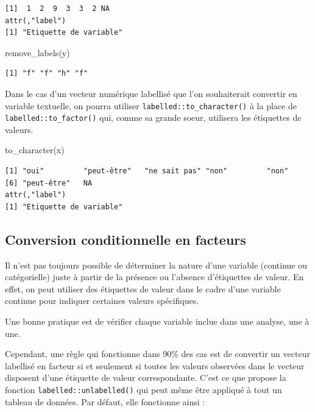 \documentclass[
  letterpaper,
  DIV=11,
  numbers=noendperiod,
  oneside]{scrreprt}
\newenvironment{Shaded}{\begin{snugshade}}{\end{snugshade}}
\newcommand{\FunctionTok}[1]{\textcolor[rgb]{0.28,0.35,0.67}{#1}}
\newcommand{\NormalTok}[1]{\textcolor[rgb]{0.00,0.23,0.31}{#1}}
\begin{document}
\begin{verbatim}
[1]  1  2  9  3  3  2 NA
attr(,"label")
[1] "Etiquette de variable"
\end{verbatim}

\begin{Shaded}
\begin{Highlighting}[]
\FunctionTok{remove\_labels}\NormalTok{(y)}
\end{Highlighting}
\end{Shaded}

\begin{verbatim}
[1] "f" "f" "h" "f"
\end{verbatim}

Dans le cas d'un vecteur numérique labellisé que l'on souhaiterait
convertir en variable textuelle, on pourra utiliser
\texttt{labelled::to\_character()} à la place de
\texttt{labelled::to\_factor()} qui, comme sa grande soeur, utilisera
les étiquettes de valeurs.

\begin{Shaded}
\begin{Highlighting}[]
\FunctionTok{to\_character}\NormalTok{(x)}
\end{Highlighting}
\end{Shaded}

\begin{verbatim}
[1] "oui"         "peut-être"   "ne sait pas" "non"         "non"        
[6] "peut-être"   NA           
attr(,"label")
[1] "Etiquette de variable"
\end{verbatim}

\hypertarget{conversion-conditionnelle-en-facteurs}{%
\subsection{Conversion conditionnelle en
facteurs}\label{conversion-conditionnelle-en-facteurs}}

Il n'est pas toujours possible de déterminer la nature d'une variable
(continue ou catégorielle) juste à partir de la présence ou l'absence
d'étiquettes de valeur. En effet, on peut utiliser des étiquettes de
valeur dans le cadre d'une variable continue pour indiquer certaines
valeurs spécifiques.

Une bonne pratique est de vérifier chaque variable inclue dans une
analyse, une à une.

Cependant, une règle qui fonctionne dans 90\% des cas est de convertir
un vecteur labellisé en facteur si et seulement si toutes les valeurs
observées dans le vecteur disposent d'une étiquette de valeur
correspondante. C'est ce que propose la fonction
\texttt{labelled::unlabelled()} qui peut même être appliqué à tout un
tableau de données. Par défaut, elle fonctionne ainsi :
\end{document}
